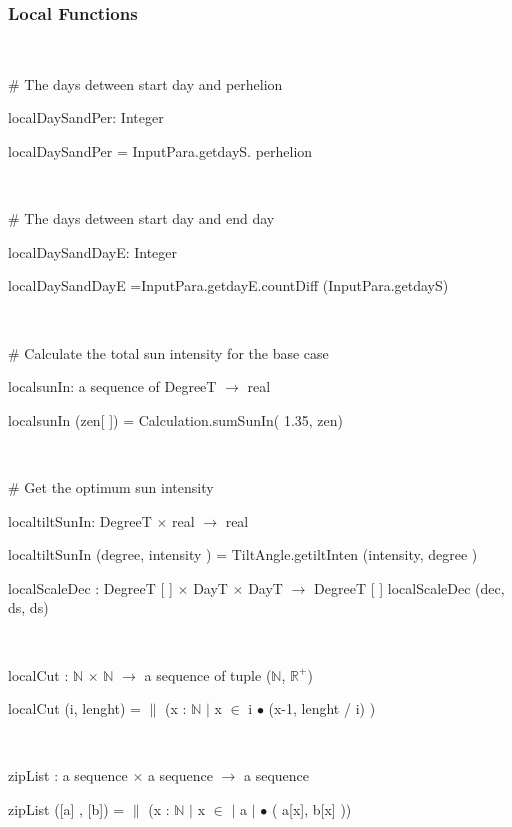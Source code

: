 \documentclass[12pt, titlepage]{article}
\begin{document}
\subsubsection{Local Functions}

~\newline

$\#$ The days detween start day and perhelion

localDaySandPer: Integer

localDaySandPer = InputPara.getdayS. perhelion

~\newline

$\#$ The days detween start day and end day

localDaySandDayE: Integer

localDaySandDayE =InputPara.getdayE.countDiff (InputPara.getdayS)

~\newline

$\#$ Calculate the total sun intensity for the base case

localsunIn: a sequence of DegreeT $\rightarrow$ real

localsunIn (zen[ ]) = Calculation.sumSunIn( 1.35, zen)

~\newline

$\#$ Get the optimum sun intensity

localtiltSunIn: DegreeT $\times$ real $\rightarrow$ real

localtiltSunIn (degree, intensity ) = TiltAngle.getiltInten (intensity, degree )


localScaleDec :  DegreeT [ ] $\times$ DayT  $\times$ DayT $\rightarrow$  DegreeT [ ] 
localScaleDec (dec, ds, ds) 





~\newline

localCut : $\mathbb{N}$  $\times$ $\mathbb{N}$ $\rightarrow$ a sequence of tuple ($\mathbb{N}$, $\mathbb{R}^+ $)

localCut (i, lenght) = $ \|$ (x : $\mathbb{N}$ $|$ x $\in$ i $\bullet$	(x-1, lenght / i) )

~\newline 

zipList : a sequence $\times$ a sequence $\rightarrow$ a sequence

zipList ([a] , [b]) = $\|$ (x : $\mathbb{N}$ $|$ x $\in$ $|$ a $|$ $\bullet$ ( a[x], b[x] ))
\end{document}
